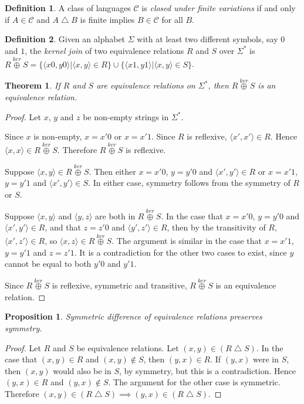 \documentclass{article}
\newtheorem{theorem}{Theorem}[section]
\newtheorem{proposition}[proposition]{Proposition}
\theoremstyle{definition} \newtheorem{definition}[definition]{Definition}
\newcommand{\kj}{\overset{ker}{\oplus}} %
\newcommand{\symdiff}{\bigtriangleup} %
\newcommand{\defn}[1]{\emph{#1}} %
\newcommand{\pair}[2]{\langle#1,#2\rangle} %
\begin{document}
\begin{definition}
  A class of languages $\mathcal{C}$ is \defn{closed under finite variations}
  if and only if $A\in \mathcal{C}$ and $A\symdiff B$ is finite implies $B\in
  \mathcal{C}$ for all $B$.
\end{definition}

\begin{definition}
  Given an alphabet $\Sigma$ with at least two different symbols, say $0$ and
  $1$, the \defn{kernel join} of two equivalence relations $R$ and $S$ over
  $\Sigma^*$ is $R\kj S=\{\pair{x0}{y0}|\pair{x}{y}\in
  R\}\cup\{\pair{x1}{y1}|\pair{x}{y}\in S\}$.
\end{definition}

\begin{theorem}
  If $R$ and $S$ are equivalence relations on $\Sigma^*$, then $R\kj S$ is an
  equivalence relation.
\end{theorem}
\begin{proof}

  Let $x$, $y$ and $z$ be non-empty strings in $\Sigma^*$.
  
  Since $x$ is non-empty, $x=x'0$ or $x=x'1$. Since $R$ is reflexive,
  $\pair{x'}{x'}\in R$. Hence $\pair{x}{x}\in R\kj S$. Therefore $R\kj S$ is
  reflexive.
  
  Suppose $\pair{x}{y}\in R\kj S$. Then either $x=x'0$, $y=y'0$ and
  $\pair{x'}{y'}\in R$ or $x=x'1$, $y=y'1$ and $\pair{x'}{y'}\in S$. In either
  case, symmetry follows from the symmetry of $R$ or $S$.

  Suppose $\pair{x}{y}$ and $\pair{y}{z}$ are both in $R\kj S$. In the case
  that $x=x'0$, $y=y'0$ and $\pair{x'}{y'}\in R$, and that $z=z'0$ and
  $\pair{y'}{z'}\in R$, then by the transitivity of $R$, $\pair{x'}{z'}\in R$,
  so $\pair{x}{z}\in R\kj S$. The argument is similar in the case that $x=x'1$,
  $y=y'1$ and $z=z'1$. It is a contradiction for the other two cases to exist,
  since $y$ cannot be equal to both $y'0$ and $y'1$.

  Since $R\kj S$ is reflexive, symmetric and transitive, $R\kj S$ is an
  equivalence relation.
\end{proof}

\begin{proposition}\label{prop:symdiff}
  Symmetric difference of equivalence relations preserves symmetry.
\end{proposition}
\begin{proof}
  Let $R$ and $S$ be equivalence relations. Let $(x,y)\in(R\symdiff S)$. In
  the case that $(x,y)\in R$ and $(x,y)\notin S$, then $(y,x)\in R$. If $(y,x)$
  were in $S$, then $(x,y)$ would also be in $S$, by symmetry, but this is a
  contradiction. Hence $(y,x)\in R$ and $(y,x)\notin S$. The argument for the
  other case is symmetric. Therefore $(x,y)\in(R\symdiff S)\implies
  (y,x)\in(R\symdiff S)$.
\end{proof}
\end{document}
